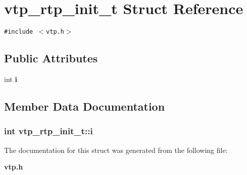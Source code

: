 \section{vtp\_\-rtp\_\-init\_\-t Struct Reference}
\label{structvtp__rtp__init__t}
{\tt \#include $<$vtp.h$>$}

\subsection*{Public Attributes}
\begin{CompactItemize}
\item 
int {\bf i}
\end{CompactItemize}


\subsection{Member Data Documentation}
\subsubsection{\setlength{\rightskip}{0pt plus 5cm}int {\bf vtp\_\-rtp\_\-init\_\-t::i}}\label{structvtp__rtp__init__t_o0}




The documentation for this struct was generated from the following file:\begin{CompactItemize}
\item 
{\bf vtp.h}\end{CompactItemize}
